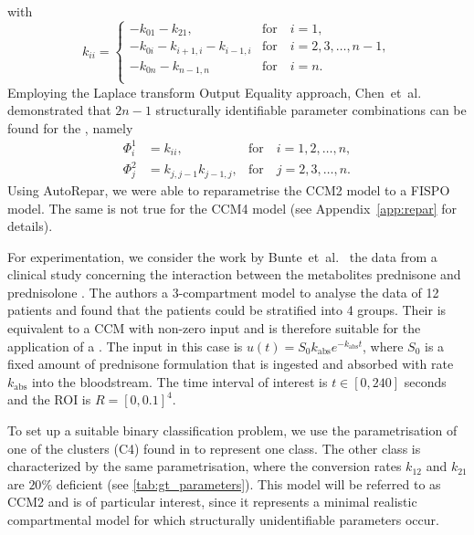 with 
\begin{equation}
    k_{ii} =
    \begin{cases}
        -k_{01} - k_{21}, & \text{for} \quad i = 1, \\
        -k_{0i} - k_{i+1,i} - k_{i-1,i}  & \text{for} \quad i = 2,3,\ldots, n-1, \\
        -k_{0n} - k_{n-1,n} & \text{for} \quad i = n. \\
    \end{cases}
\end{equation}
Employing the Laplace transform Output Equality approach, Chen~et~al.~\cite{CHEN198559} demonstrated that $2n-1$ structurally identifiable parameter combinations can be found for the , namely
\begin{align}
    \Phi^1_{i} &= k_{ii}, &\text{for} \quad i = 1,2,\ldots, n, \\
    \Phi^2_{j} &= k_{j,j-1} k_{j-1,j}, &\text{for} \quad j = 2,3,\ldots, n.
\end{align}
Using AutoRepar, we were able to reparametrise the CCM2 model to a FISPO model.
The same is not true for the CCM4 model (see Appendix~\ref{app:repar} for details).

For experimentation, we consider the work by Bunte~et~al.~\cite{bunte2018learning}  the data from a clinical study concerning the interaction between the metabolites prednisone and prednisolone . 
The authors  a 3-compartment model  to analyse the data of 12 patients and found that the patients could be stratified into 4 groups.
Their  is equivalent to a CCM  with non-zero input and is therefore suitable for the application of a \myMethod{}.
The input in this case is $u(t) = S_{0} k_{\text{abs}} e^{-k_{\text{abs}} t}$, where $S_{0}$ is a fixed amount of prednisone formulation that is ingested and absorbed with rate $k_{\text{abs}}$ into the bloodstream.
The time interval of interest is $t \in [0, 240]$ seconds and the ROI
is $R = [0, 0.1]^{4}$.

To set up a suitable binary classification problem, we use the parametrisation of one of the clusters (C4) found in \cite{bunte2018learning} to represent one  class.
The other class is characterized by the same parametrisation, where the conversion rates $k_{12}$ and $k_{21}$ are $20 \%$ deficient (see \autoref{tab:gt_parameters}).
This model will be referred to as CCM2 and is of particular interest, since it represents a minimal realistic compartmental model for which structurally unidentifiable parameters occur.

